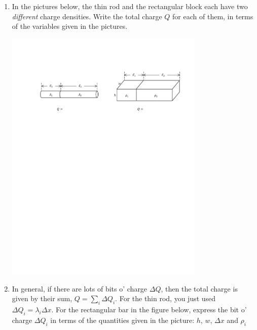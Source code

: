 \begin{enumerate}[labparts]
\item In the pictures below, the thin rod and the rectangular block each have two \textit{different} charge densities.  Write the total charge $Q$ for each of them, in terms of the variables given in the pictures.
\begin{center}
\includegraphics[width=0.75\textwidth]{charge_density/fig1.pdf}
\end{center}

\item In general, if there are lots of bits o' charge $\Delta Q$, then the total charge is given by their sum, $Q = \sum_i \Delta Q_i$. For the thin rod, you just used $\Delta Q_i = \lambda_i \Delta x$.  For the rectangular bar in the figure below, express the bit o' charge $\Delta Q_i$ in terms of the quantities given in the picture: $h$, $w$, $\Delta x$ and $\rho_i$


\end{enumerate}
